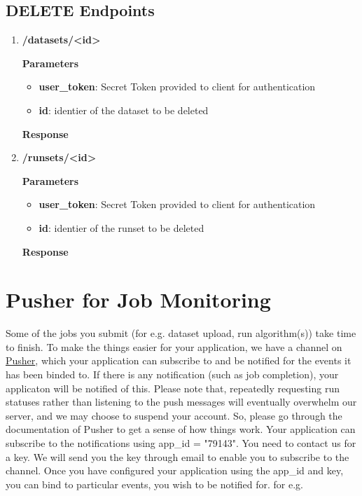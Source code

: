\documentclass[a4paper,10pt]{scrartcl}
\begin{document}
\subsection{DELETE Endpoints}
\begin{enumerate}
\item \textbf{/datasets/<id>}
\textbf{Parameters}
\begin{itemize}
 \item \textbf{user\_token}: Secret Token provided to client for authentication
 \item \textbf{id}: identier of the dataset to be deleted 
\end{itemize}
\textbf{Response}
%
\item \textbf{/runsets/<id>}
\textbf{Parameters}
\begin{itemize}
  \item \textbf{user\_token}: Secret Token provided to client for authentication
 \item \textbf{id}: identier of the runset to be deleted 
\end{itemize}
\textbf{Response}
\end{enumerate}

\section{Pusher for Job Monitoring}
Some of the jobs you submit (for e.g. dataset upload, run algorithm(s)) take time to finish. 
To make the things easier for your application, we have a channel on \href{https://pusher.com/}{Pusher},
which your application can subscribe to and be notified for the events it has been binded to. If there is any notification 
(such as job completion), your applicaton will be notified of this. Please note that, repeatedly requesting
run statuses rather than listening to the push messages will eventually overwhelm our server, and we may choose
to suspend your account. So, please go through the documentation of Pusher to get a sense of how things work. Your 
application can subscribe to the notifications using app\_id = "79143". You need to contact us for a key. We will send 
you the key through email to enable you to subscribe to the channel. Once you have configured your application using the 
app\_id and key, you can bind to particular events, you wish to be notified for. for e.g. 
\end{document}

